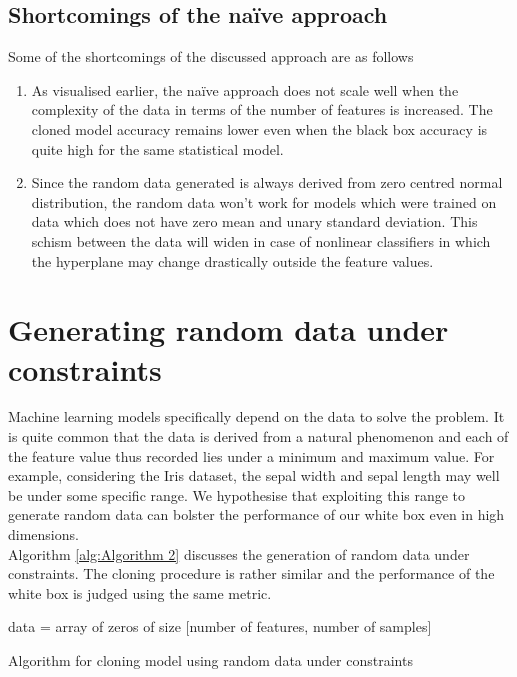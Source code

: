 \documentclass[9pt,twocolumn,twoside]{pnas-new}
\begin{document}
\subsection*{Shortcomings of the naïve approach}
Some of the shortcomings of the discussed approach are as follows
\begin{enumerate}
    \item As visualised earlier, the naïve approach does not scale well when the complexity of the data in terms of the number of features is increased. The cloned model accuracy remains lower even when the black box accuracy is quite high for the same statistical model.
    \item Since the random data generated is always derived from zero centred normal distribution, the random data won't work for models which were trained on data which does not have zero mean and unary standard deviation. This schism between the data will widen in case of nonlinear classifiers in which the hyperplane may change drastically outside the feature values.
\end{enumerate}

\section*{Generating random data under constraints}

Machine learning models specifically depend on the data to solve the problem. It is quite common that the data is derived from a natural phenomenon and each of the feature value thus recorded lies under a minimum and maximum value. For example, considering the Iris dataset, the sepal width and sepal length may well be under some specific range. We hypothesise that exploiting this range to generate random data can bolster the performance of our white box even in high dimensions.\\
Algorithm \ref{alg:Algorithm 2} discusses the generation of random data under constraints. The cloning procedure is rather similar and the performance of the white box is judged using the same metric.

\begin{algorithm2e}
 data = array of zeros of size [number of features, number of samples]\;
 \caption{Algorithm for cloning model using random data under constraints}
 \label{alg:Algorithm 2}
\end{algorithm2e}
\end{document}
